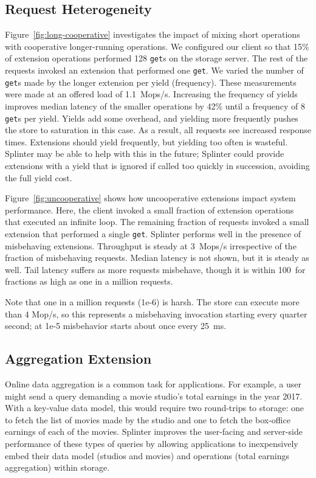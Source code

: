 \subsection{Request Heterogeneity}

Figure~\ref{fig:long-cooperative} investigates the impact of mixing short operations
with cooperative longer-running operations.
We configured our client so that
15\% of extension operations performed
128 \texttt{get}s on the storage server. The rest of the
requests invoked an extension that performed one \texttt{get}.
We varied the number of \texttt{get}s made by the longer
extension per yield (frequency).
These measurements were made at an offered load of 1.1~Mops/s.
Increasing the frequency of yields improves median
latency of the smaller operations by 42\% until a frequency of 8 \texttt{get}s per
yield.
Yields add some overhead, and yielding more frequently pushes the store to
  saturation in this case.
As a result, all requests see increased response times.
Extensions should yield frequently, but
yielding too often is wasteful.
Splinter may be able to help with this in the future; Splinter could provide
  extensions with a yield that is ignored if called too quickly in succession,
  avoiding the full yield cost.

Figure~\ref{fig:uncooperative} shows how uncooperative
  extensions impact system performance. Here, the client invoked a
  small fraction of extension operations that executed an infinite
  loop.
The remaining fraction of requests invoked a small extension that performed a
  single \texttt{get}.
Splinter performs well in the presence of misbehaving extensions.
Throughput is steady at 3~Mops/s
  irrespective of the fraction of misbehaving requests.
Median latency is not shown, but it is steady as well.
Tail latency suffers as more requests misbehave, though it is within
  100~\us for fractions as high as one in a million requests.

Note that one in a million requests (1e-6) is harsh.
The store can execute more than 4 Mop/s, so this represents a misbehaving
  invocation starting every quarter second; at 1e-5 misbehavior starts about once
  every 25~ms.

\subsection{Aggregation Extension}
\label{sec:eval-agg}

Online data aggregation is a common task for applications.
For example, a user might send a query
  demanding a movie studio's total earnings in the year 2017.
With a key-value data model, this would require two
  round-trips to storage:
one to fetch the list of movies made
  by the studio and one to fetch the box-office earnings of each
  of the movies.
Splinter improves the user-facing and server-side performance of these types of
  queries by allowing applications to inexpensively embed their data model
  (studios and movies) and operations (total earnings aggregation) within
  storage.

